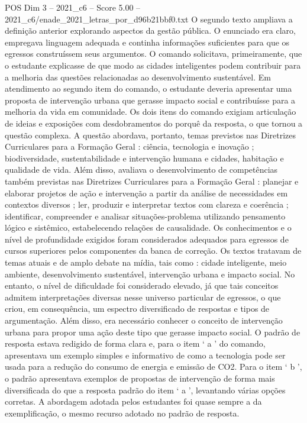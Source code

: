 \begin{textsample}{POS Dim 3 – 2021\_c6 – Score 5.00 – 2021\_c6/enade\_2021\_letras\_por\_d96b21bbf0.txt}
O segundo texto ampliava a definição anterior explorando aspectos da gestão pública.
O enunciado era claro, empregava linguagem adequada e continha informações suficientes para que os egressos construíssem seus argumentos.
O comando solicitava, primeiramente, que o estudante explicasse de que modo as cidades inteligentes podem contribuir para a melhoria das questões relacionadas ao desenvolvimento sustentável.
Em atendimento ao segundo item do comando, o estudante deveria apresentar uma proposta de intervenção urbana que gerasse impacto social e contribuísse para a melhoria da vida em comunidade.
Os dois itens do comando exigiam articulação de ideias e exposições com desdobramentos do porquê da resposta, o que tornou a questão complexa.
A questão abordava, portanto, temas previstos nas Diretrizes Curriculares para a Formação Geral : ciência, tecnologia e inovação ; biodiversidade, sustentabilidade e intervenção humana e cidades, habitação e qualidade de vida.
Além disso, avaliava o desenvolvimento de competências também previstas nas Diretrizes Curriculares para a Formação Geral : planejar e elaborar projetos de ação e intervenção a partir da análise de necessidades em contextos diversos ; ler, produzir e interpretar textos com clareza e coerência ; identificar, compreender e analisar situações-problema utilizando pensamento lógico e sistêmico, estabelecendo relações de causalidade.
Os conhecimentos e o nível de profundidade exigidos foram considerados adequados para egressos de cursos superiores pelos componentes da banca de correção.
Os textos tratavam de temas atuais e de amplo debate na mídia, tais como : cidade inteligente, meio ambiente, desenvolvimento sustentável, intervenção urbana e impacto social.
No entanto, o nível de dificuldade foi considerado elevado, já que tais conceitos admitem interpretações diversas nesse universo particular de egressos, o que criou, em consequência, um espectro diversificado de respostas e tipos de argumentação.
Além disso, era necessário conhecer o conceito de intervenção urbana para propor uma ação deste tipo que gerasse impacto social.
O padrão de resposta estava redigido de forma clara e, para o item ‘ a ’ do comando, apresentava um exemplo simples e informativo de como a tecnologia pode ser usada para a redução do consumo de energia e emissão de CO2.
Para o item ‘ b ’, o padrão apresentava exemplos de propostas de intervenção de forma mais diversificada do que a resposta padrão do item ‘ a ’, levantando várias opções corretas.
A abordagem adotada pelos estudantes foi quase sempre a da exemplificação, o mesmo recurso adotado no padrão de resposta.

\end{textsample}

